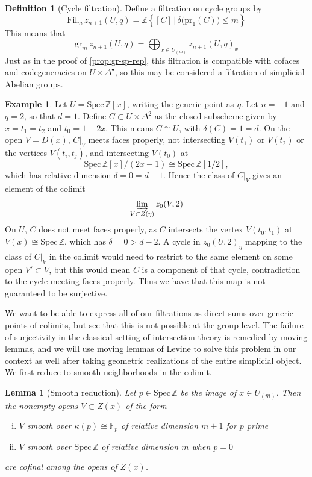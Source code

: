 \documentclass[11pt, twoside]{article}
\numberwithin{equation}{section}
\newtheorem{lemma}[equation]{Lemma}
\theoremstyle{definition}
\newtheorem{definition}[equation]{Definition}
\newtheorem{example}[equation]{Example}
\newcommand{\bb}[1]{\mathbb{#1}}
\newcommand{\colim}{\varinjlim}
\newcommand{\spec}{\mathrm{Spec} \,}
\newcommand{\pr}{\mathrm{pr}}
\newcommand{\fil}{\mathrm{Fil}}
\newcommand{\gr}{\mathrm{gr}}
\begin{document}
\begin{definition}[Cycle filtration]
Define a filtration on cycle groups by 
\[\fil_m \, z_{n + 1}(U, q) = \bb{Z} \! \left\{[C] \, \big| \, \delta\big(\pr_1(C)\big) \leq m\right\}\] 
This means that 
\[\gr_m \, z_{n + 1}(U, q) = \bigoplus_{x \in U_{(m)}} z_{n + 1}(U, q)_x\]
Just as in the proof of \ref{prop:gr-sp-rep}, this filtration is compatible with cofaces and codegeneracies on \(U \times \Delta^\bullet\), so this may be considered a filtration of simplicial Abelian groups.
\end{definition}

\begin{example}
Let \(U = \spec \bb{Z}[x]\), writing the generic point as \(\eta\). Let \(n = - 1\) and \(q = 2\), so that \(d = 1\). Define \(C \subset U \times \Delta^2\) as the closed subscheme given by \(x = t_1 = t_2\) and \(t_0 = 1 - 2x\). This means \(C \cong U\), with \(\delta(C) = 1 = d\). On the open \(V = D(x)\), \(C|_V\) meets faces properly, not intersecting \(V(t_1)\) or \(V(t_2)\) or the vertices \(V(t_i, t_j)\), and intersecting \(V(t_0)\) at 
\[\spec \bb{Z}[x]/(2x - 1) \cong \spec \bb{Z}[1/2],\]
which has relative dimension \(\delta = 0 = d - 1\). Hence the class of \(C|_V\) gives an element of the colimit
\[\colim_{V \subset Z(\eta)} z_0(V, 2)\]
On \(U\), \(C\) does not meet faces properly, as \(C\) intersects the vertex \(V(t_0, t_1)\) at \(V(x) \cong \spec \bb{Z}\), which has \(\delta = 0 > d - 2\). A cycle in \(z_0(U, 2)_\eta\) mapping to the class of \(C|_V\) in the colimit would need to restrict to the same element on some open \(V' \subset V\), but this would mean \(C\) is a component of that cycle, contradiction to the cycle meeting faces properly. Thus we have that this map is not guaranteed to be surjective. 
\end{example}

We want to be able to express all of our filtrations as direct sums over generic points of colimits, but see that this is not possible at the group level. The failure of surjectivity in the classical setting of intersection theory is remedied by moving lemmas, and we will use moving lemmas of Levine to solve this problem in our context as well after taking geometric realizations of the entire simplicial object. We first reduce to smooth neighborhoods in the colimit.

\begin{lemma}[Smooth reduction]\label{lemm:sm-red}
Let \(p \in \spec \bb{Z}\) be the image of \(x \in U_{(m)}\). Then the nonempty opens \(V \subset Z(x)\) of the form 

\begin{enumerate}[i)]

\item \(V\) smooth over \(\kappa(p) \cong \bb{F}_p\) of relative dimension \(m + 1\) for \(p\) prime

\item \(V\) smooth over \(\spec \bb{Z}\) of relative dimension \(m\) when \(p = 0\)

\end{enumerate}
are cofinal among the opens of \(Z(x)\).
\end{lemma}
\end{document}
